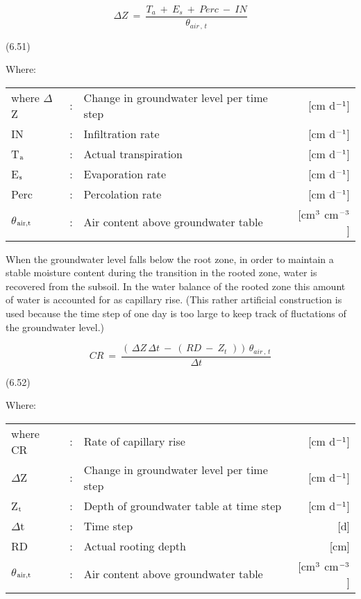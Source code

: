 \begin{equation}
\Delta Z ~=~{\frac{T _{a} ~+~ E _{s} ~+~ Perc ~-~ IN }{\theta _{air\, ,\, t} }}
\end{equation}

 
\strut\hfill (6.51)

Where:\\
\begin{tabularx}{\textwidth}{llXr}



where $\Delta$Z &:& Change in groundwater level per time step  & [cm d$^{{\rm -1}}$]\\
IN &:& Infiltration rate  & [cm d$^{{\rm -1}}$]\\
T$_{{\rm a}}$ &:& Actual transpiration  & [cm d$^{{\rm -1}}$]\\
E$_{{\rm s}}$ &:& Evaporation rate  & [cm d$^{{\rm -1}}$]\\
Perc &:& Percolation rate  & [cm d$^{{\rm -1}}$]\\
$\theta$$_{{\rm air,t}}$ &:& Air content above groundwater table  & [cm$^{{\rm 3}}$ cm$^{{\rm -3}}$]
\end{tabularx}



When the groundwater level falls below the root zone, in order to maintain a stable
moisture content during the transition in the rooted zone, water is recovered from the
subsoil. In the water balance of the rooted zone this amount of water is accounted for as
capillary rise. (This rather artificial construction is used because the time step of one day
is too large to keep track of fluctations of the groundwater level.)

\begin{equation}
CR ~=~{\frac{ (\, \Delta Z\, \Delta t ~-~ (\, RD ~-~ Z _{t} \,\, ))\, \theta  _{air\, ,\, t} }{\Delta t}}
\end{equation}

 
\strut\hfill (6.52)

Where:\\
\begin{tabularx}{\textwidth}{llXr}



where CR &:& Rate of capillary rise  & [cm d$^{{\rm -1}}$]\\
$\Delta$Z &:& Change in groundwater level per time step  & [cm d$^{{\rm -1}}$]\\
Z$_{{\rm t}}$ &:& Depth of groundwater table at time step  & [cm d$^{{\rm -1}}$]\\
$\Delta$t &:& Time step  & [d]\\
RD &:& Actual rooting depth  & [cm]\\
$\theta$$_{{\rm air,t}}$ &:& Air content above groundwater table  & [cm$^{{\rm 3}}$ cm$^{{\rm -3}}$]
\end{tabularx}



